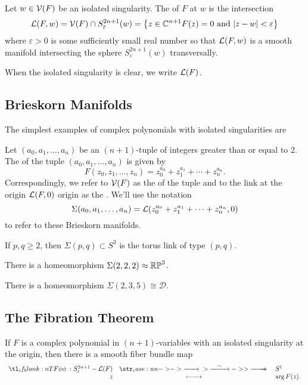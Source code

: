 \begin{definition}
	Let $w\in \mathcal{V}(F)$ be an isolated singularity. The  of $F$ at $w$ is the intersection
	\[
		\mathcal{L}(F, w) = \mathcal{V}(F) \cap S^{2n+1}_\varepsilon(w) = \left\{ z\in \mathbb{C}^{n+1}  F(z)=0\textrm{ and } |z-w|<\varepsilon\right\}
	\]
	where $\varepsilon > 0$ is some sufficiently small real number so that $\mathcal{L}(F,w)$ is a smooth manifold intersecting the sphere $S^{2n+1}_\varepsilon(w)$ transversally.
\end{definition}

When the isolated singularity is clear, we write $\mathcal{L}(F)$.

\subsection{Brieskorn Manifolds}
The simplest examples of complex polynomials with isolated singularities are 

\begin{definition}
	Let $(a_0,a_1,\ldots, a_n)$ be an $(n+1)$-tuple of integers greater than or equal to $2$. The  of the tuple $(a_0,a_1,\ldots, a_n)$ is given by
	\[
		F(z_0,z_1,\ldots, z_n) = z_0^{a_0} + z_1^{a_1} +\cdots + z_n^{a_n}.
	\]
	Correspondingly, we refer to $\mathcal{V}(F)$ as the  of the tuple and to the link at the origin $\mathcal{L}(F,0)$ origin as the . We'll use the notation
	\[
		\Sigma(a_0,a_1,\ldots, a_n) =\mathcal{L}(z_0^{a_0}+z_1^{a_1}+\cdots+z_n^{a_n}, 0)
	\]
	to refer to these Brieskorn manifolds.
\end{definition}


\begin{proposition}
	If $p,q\geq 2$, then $\Sigma(p,q)\subset S^3$ is the torus link of type $(p,q)$.
\end{proposition}

\begin{proposition}
	There is a homeomorphism $\Sigma(2,2,2)\approx \mathbb{RP}^3$.
\end{proposition}

\begin{proposition}
	There is a homeomorphism $\Sigma(2,3,5)\cong \mathscr{D}$.
\end{proposition}

\subsection{The Fibration Theorem}

\begin{theorem}\label{thm:fibration}
	If $F$ is a complex polynomial in $(n+1)$-variables with an isolated singularity at the origin, then there is a smooth fiber bundle map
	\[
		\lkxfunc{\phi}{S^{2n+1}_\varepsilon - \L(F)}{S^1}{z}{\arg F(z).}
	\]
\end{theorem}


